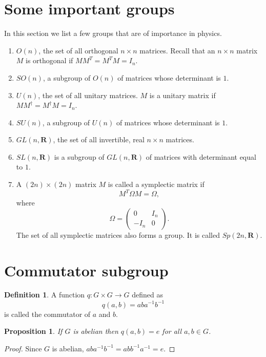 \documentclass{article}
\newcommand{\sor}{\mathbf{R}}
\theoremstyle{plain}
\numberwithin{thm}{section}
\theoremstyle{plain}
\newtheorem{prop}{Proposition}
\numberwithin{prop}{section}
\theoremstyle{definition}
\newtheorem{defn}{Definition}
\numberwithin{defn}{section}
\theoremstyle{remark}
\numberwithin{equation}{section}
\begin{document}
\section{Some important groups}\label{s4}
In this section we list a few groups that are of importance in physics.
\begin{enumerate}
\item $O(n)$, the set of all orthogonal $n \times n$ matrices. Recall that an
$n \times n$ matrix $M$ is orthogonal if $MM^T = M^T M = I_n$.
\item $SO(n)$, a subgroup of $O(n)$ of matrices whose determinant is $1$.
\item $U(n)$, the set of all unitary matrices. $M$ is a unitary matrix if
$MM^\dagger = M^\dagger M = I_n$.
\item $SU(n)$, a subgroup of $U(n)$ of matrices whose determinant is $1$.
\item $GL(n, \sor)$, the set of all invertible, real $n \times n$ matrices.
\item $SL(n, \sor)$ is a subgroup of $GL(n, \sor)$ of matrices with determinant
equal to $1$.
\item A $(2n) \times (2n)$ matrix $M$ is called a symplectic matrix if
\begin{equation}\label{s4e1}
M^T\Omega M = \Omega,
\end{equation}
where
\begin{equation}\label{s4e2}
\Omega = \begin{pmatrix}0 & I_n \\ -I_n & 0 \end{pmatrix}.
\end{equation}
The set of all symplectic matrices also forms a group. It is called $Sp(2n,
\sor)$.
\end{enumerate}

\section{Commutator subgroup}\label{s5}
\begin{defn}\label{s5d1}
A function $q: G \times G \rightarrow G$ defined as
\[
q(a, b) = aba^{-1}b^{-1}
\]
is called the commutator of $a$ and $b$.
\end{defn}

\begin{prop}\label{s5p1}
If $G$ is abelian then $q(a, b) = e$ for all $a, b \in G$.
\end{prop}
\begin{proof}
Since $G$ is abelian, $aba^{-1}b^{-1} = abb^{-1}a^{-1} = e$.
\end{proof}
\end{document}
